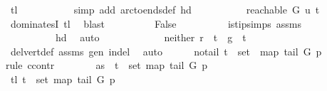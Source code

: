 \begin{isabellebody}
\ tl\ \isanewline
\ \ \ \ \ \ \ \ \isamarkupfalse%
\ {\isacharparenleft}{\kern0pt}simp\ add{\isacharcolon}{\kern0pt}\ arc{\isacharunderscore}{\kern0pt}to{\isacharunderscore}{\kern0pt}ends{\isacharunderscore}{\kern0pt}def\ hd{\isacharparenright}{\kern0pt}\ \isanewline
\ \ \ \ \ \ \isamarkupfalse%
\ \isamarkupfalse%
\ {\isachardoublequoteopen}reachable{}\ G\ u\ t{\isachardoublequoteclose}\isanewline
\ \ \ \ \ \ \ \ \isamarkupfalse%
\ dominatesI\ tl\ \isamarkupfalse%
\ blast\isanewline
\ \ \ \ \ \ \isamarkupfalse%
\ \isamarkupfalse%
\ False\isanewline
\ \ \ \ \ \ \ \ \isamarkupfalse%
\ is{\isacharunderscore}{\kern0pt}tip{\isachardot}{\kern0pt}simps\ assms{\isacharparenleft}{\kern0pt}{}{\isacharparenright}{\kern0pt}\isanewline
\ \ \ \ \ \ \ \ \ \ hd\ \isamarkupfalse%
\ auto\ \ \isanewline
\ \ \ \ \isamarkupfalse%
\isanewline
\ \ \ \ \isamarkupfalse%
\ neither{\isacharcolon}{\kern0pt}\ {\isachardoublequoteopen}r\ {\isasymnoteq}\ t\ {\isasymand}\ g\ {\isasymnoteq}\ t{\isachardoublequoteclose}\isanewline
\ \ \ \ \ \ \isamarkupfalse%
\ del{\isacharunderscore}{\kern0pt}vert{\isacharunderscore}{\kern0pt}def\ assms{\isacharparenleft}{\kern0pt}{}{\isacharparenright}{\kern0pt}\ gen\ in{\isacharunderscore}{\kern0pt}del\ \isamarkupfalse%
\ auto\isanewline
\ \ \ \ \isamarkupfalse%
\ no{\isacharunderscore}{\kern0pt}tail{\isacharcolon}{\kern0pt}\ {\isachardoublequoteopen}t\ {\isasymnotin}\ {\isacharparenleft}{\kern0pt}set\ {\isacharparenleft}{\kern0pt}\ map\ {\isacharparenleft}{\kern0pt}tail\ G{\isacharparenright}{\kern0pt}\ p{\isacharparenright}{\kern0pt}{\isacharparenright}{\kern0pt}{\isachardoublequoteclose}\isanewline
\ \ \ \ \isamarkupfalse%
{\isacharparenleft}{\kern0pt}rule\ ccontr{\isacharparenright}{\kern0pt}\isanewline
\ \ \ \ \ \ \isamarkupfalse%
\ as{}{\isacharcolon}{\kern0pt}\ {\isachardoublequoteopen}{\isasymnot}\ t\ {\isasymnotin}\ set\ {\isacharparenleft}{\kern0pt}map\ {\isacharparenleft}{\kern0pt}tail\ G{\isacharparenright}{\kern0pt}\ p{\isacharparenright}{\kern0pt}{\isachardoublequoteclose}\isanewline
\ \ \ \ \ \ \isamarkupfalse%
\ \isamarkupfalse%
\ tl{}{\isacharcolon}{\kern0pt}\ {\isachardoublequoteopen}t\ {\isasymin}\ set\ {\isacharparenleft}{\kern0pt}map\ {\isacharparenleft}{\kern0pt}tail\ G{\isacharparenright}{\kern0pt}\ p{\isacharparenright}{\kern0pt}{\isachardoublequoteclose}\ \isamarkupfalse%

\end{isabellebody}
